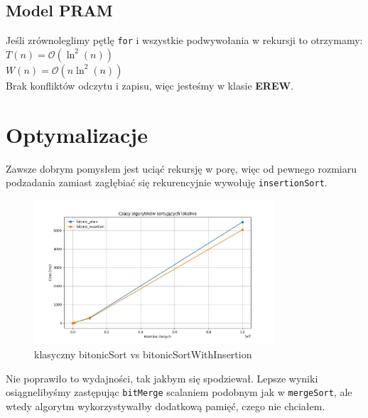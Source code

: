 \documentclass{article}
\begin{document}
\newpage 

\subsection*{Model PRAM}
Jeśli zrównoleglimy pętlę \texttt{for} i wszystkie podwywołania w rekursji to otrzymamy: \\
$T(n) = \mathcal{O}(\ln^2(n))$ \\ 
$W(n) = \mathcal{O}(n\ln^2(n))$ \\
Brak konfliktów odczytu i zapisu, więc jesteśmy w klasie \textbf{EREW}.

\section*{Optymalizacje}
Zawsze dobrym pomysłem jest uciąć rekursję w porę, więc od pewnego rozmiaru podzadania zamiast zagłębiać się rekurencyjnie wywołuję \texttt{insertionSort}.

\begin{figure}[htp]
    \centering
    \includegraphics[width=0.8\textwidth]{czasy_lokalne_opt.jpg}
    \caption{klasyczny bitonicSort vs bitonicSortWithInsertion}
\end{figure}
Nie poprawiło to wydajności, tak jakbym się spodziewał. Lepsze wyniki osiągnelibyśmy zastępując \texttt{bitMerge} scalaniem podobnym jak w \texttt{mergeSort}, ale wtedy algorytm wykorzystywałby dodatkową pamięć, czego nie chciałem.

\newpage
\end{document}
